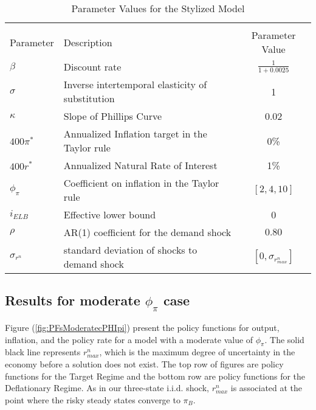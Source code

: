 \documentclass[11pt]{article}
\begin{document}
	\begin{table}[!htp]
		{\small
			\begin{center}
				\caption{Parameter Values for the Stylized Model\label{tab:ParameterValues_AR1}}
				\vspace{-1.5em}
				\begin{tabular}{llc}
					\multicolumn{3}{c}{}\\
					Parameter & Description  & Parameter Value  \\
					\hline
					\hline
					$\beta$ & Discount rate & $\frac{1}{1+0.0025}$ \\
					$\sigma$ & Inverse intertemporal elasticity of substitution  & 1\\
					$\kappa$ & Slope of Phillips Curve & 0.02 \\
					$400\pi^*$ & Annualized Inflation target in the Taylor rule & 0\%\\
					$400r^*$ & Annualized Natural Rate of Interest & 1\%\\
					$\phi_{\pi}$ & Coefficient on inflation in the Taylor rule & $[2, 4, 10]$\\
					$i_{ELB}$    & Effective lower bound & 0\\
					\hline
					$\rho$ & AR(1) coefficient for the demand shock & $0.80$ \\
					$\sigma_{r^n}$ & standard deviation of shocks to demand shock & $[0, \sigma_{r^n_{max}}]$\\
					\hline
					\hline
				\end{tabular}
			\end{center}
		}
		\vspace{-0.5em}
	\end{table}

	\subsection{Results for moderate $\phi_{\pi}$ case}	
	Figure (\ref{fig:PFsModeratecPHIpi}) present the policy functions for output, inflation, and the policy rate for a model with a moderate value of $\phi_{\pi}$. The solid black line represents $r^n_{max}$, which is the maximum degree of uncertainty in the economy before a solution does not exist. The top row of figures are policy functions for the Target Regime and the bottom row are policy functions for the Deflationary Regime. As in our three-state i.i.d. shock, $r^n_{max}$ is associated at the point where the risky steady states converge to $\pi_B$. 
	
\end{document}
